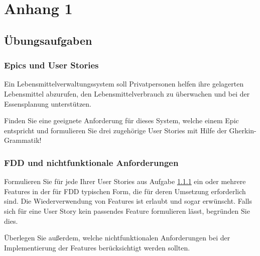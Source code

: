 \documentclass[acmtog]{acmart}
\begin{document}



\appendix

\section{Anhang 1}

\subsection{Übungsaufgaben}
\subsubsection{Epics und User Stories}\label{aufg:epics-und-user-stories}
Ein Lebensmittelverwaltungssystem soll Privatpersonen helfen ihre gelagerten Lebensmittel abzurufen,
den Lebensmittelverbrauch zu überwachen und bei der Essensplanung unterstützen.

Finden Sie eine geeignete Anforderung für dieses System, welche einem Epic entspricht und formulieren Sie drei zugehörige
User Stories mit Hilfe der Gherkin-Grammatik!

\subsubsection{FDD und nichtfunktionale Anforderungen}
Formulieren Sie für jede Ihrer User Stories aus Aufgabe \ref{aufg:epics-und-user-stories} ein oder mehrere Features in der für FDD typischen Form, die für deren Umsetzung erforderlich sind. Die Wiederverwendung von Features ist erlaubt und sogar erwünscht. Falls sich für eine User Story kein passendes Feature formulieren lässt, begründen Sie dies.

Überlegen Sie außerdem, welche nichtfunktionalen Anforderungen bei der Implementierung der Features berücksichtigt werden sollten.
\end{document}
